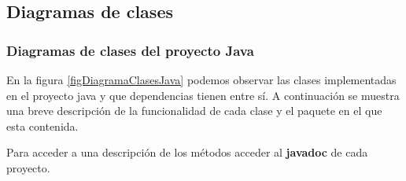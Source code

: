 \subsection{Diagramas de clases}
\subsubsection{Diagramas de clases del proyecto Java}

En la figura \ref{figDiagramaClasesJava} podemos observar las clases implementadas en el proyecto java y que dependencias tienen entre sí. A continuación se muestra una breve descripción de la funcionalidad de cada clase y el paquete en el que esta contenida.

Para acceder a una descripción de los métodos acceder al \textbf{javadoc} de cada proyecto.

